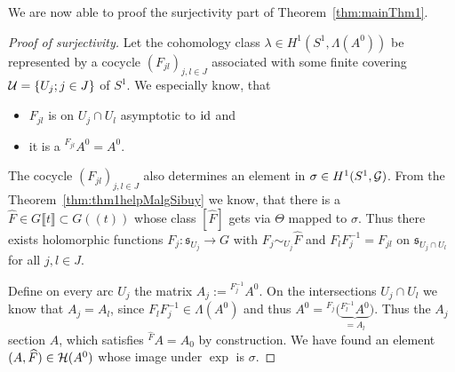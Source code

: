We are now able to proof the surjectivity part of Theorem~\ref{thm:mainThm1}.
\begin{proof}[Proof of surjectivity]
  Let the cohomology class $\lambda\in H^1(S^1,\Lambda(A^0))$ be represented by
  a cocycle $(F_{jl})_{j,l\in J}$ associated with some finite covering
  $\mathcal{U}=\{U_j;j\in J\}$ of $S^1$. We especially know, that
  \begin{itemize}
    \item $F_{jl}$ is on $U_j\cap U_l$ asymptotic to $\operatorname{id}$ and
    \item it is a  ${}^{F_{jl}}A^0=A^0$.
  \end{itemize}
  The cocycle $(F_{jl})_{j,l\in J}$ also determines an element in
  $\sigma\in H^1(S^1,\mathcal{G})$.
  From the Theorem~\ref{thm:thm1helpMalgSibuy} we know, that there is a $\hat
  F\in G\llbracket t\rrbracket\subset G(\!(t)\!)$ whose class $[\hat F]$ gets
  via $\Theta$ mapped to $\sigma$.
  Thus there exists holomorphic functions $F_j:\mathfrak{s}_{U_j}\to G$ with
  $F_j\sim_{U_j}\hat F$ and $F_lF_j^{-1}=F_{jl}$ on
  $\mathfrak{s}_{U_j\cap U_l}$ for all $j,l\in J$.

  Define on every arc $U_j$ the matrix $A_j:={}^{F_j^{-1}}A^0$.
  On the intersections $U_j\cap U_l$ we know that $A_j=A_l$, since
  $F_lF_j^{-1}\in\Lambda(A^0)$ and thus
  $A^0={}^{F_j}\Big(\underset{=A_l}{\underbrace{{}^{F_l^{-1}}A^0}}\Big)$.
  Thus the $A_j$  section $A$, which satisfies
  ${}^{\hat F}A=A_0$ by construction.
  We have found an element $(A,\widehat F)\in\mathcal{H}(A^0)$ whose image under $\exp$ is
  $\sigma$.
\end{proof}

